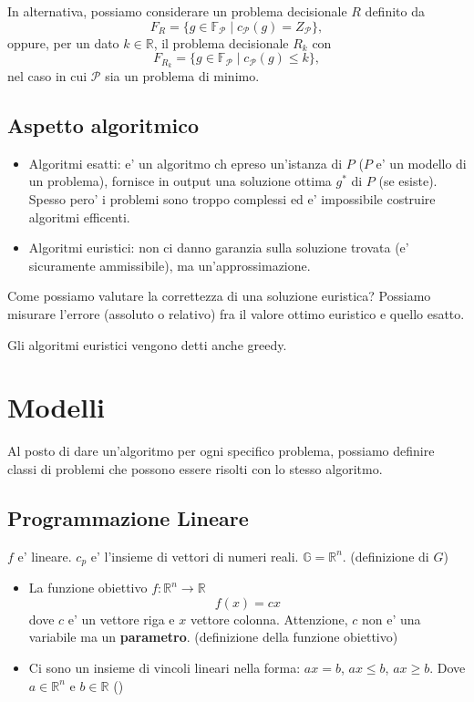 In alternativa, possiamo considerare un problema decisionale $R$ definito da
\[
F_R = \{ g \in \mathbb{F}_\mathcal{P} \mid c_\mathcal{P}(g) = Z_\mathcal{P} \},
\]
oppure, per un dato $k \in \mathbb{R}$, il problema decisionale $R_k$ con
\[
F_{R_k} = \{ g \in \mathbb{F}_\mathcal{P} \mid c_\mathcal{P}(g) \le k \},
\]
nel caso in cui $\mathcal{P}$ sia un problema di minimo.

\subsection{Aspetto algoritmico}
\begin{itemize}
  \item Algoritmi esatti: e' un algoritmo ch epreso un'istanza di $ P $ ($ P $ e' un modello di un problema), fornisce in output una soluzione ottima $ g^* $ di $ P $ (se esiste). Spesso pero' i problemi sono troppo complessi ed e' impossibile costruire algoritmi efficenti.
  \item Algoritmi euristici: non ci danno garanzia sulla soluzione trovata (e' sicuramente ammissibile), ma un'approssimazione.
\end{itemize}

Come possiamo valutare la correttezza di una soluzione euristica? Possiamo misurare l'errore (assoluto o relativo) fra il valore ottimo euristico e quello esatto.

Gli algoritmi euristici vengono detti anche greedy.

\section{Modelli}
Al posto di dare un'algoritmo per ogni specifico problema, possiamo definire classi di problemi che possono essere risolti con lo stesso algoritmo.

\subsection{Programmazione Lineare}

$ f $ e' lineare. 
$ c_p $ e' l'insieme di vettori di numeri reali. $ \mathbb{G} = \mathbb{R}^n $. (definizione di $ G $)

\begin{itemize}
\item La funzione obiettivo $ f: \mathbb{R}^n \to \mathbb{R} $
  \[
    f(x) = cx
  \]
    dove $ c $ e' un vettore riga e $ x $ vettore colonna. Attenzione, $ c $ non e' una variabile ma un \textbf{parametro}. (definizione della funzione obiettivo)
  \item Ci sono un insieme di vincoli lineari nella forma: $ ax = b $, $ ax \leq b $, $ ax \geq b $. Dove $ a \in \mathbb{R}^n $ e $ b \in \mathbb{R} $ ()
\end{itemize}


